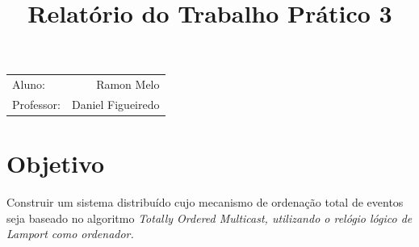 \documentclass[a4paper,12pt]{article}
\title{Relatório do Trabalho Prático 3} %
\begin{document}
        \maketitle %

        \begin{center}
            \begin{tabular}{l r}
                Aluno: & Ramon Melo \\ %
                Professor: & Daniel Figueiredo %
            \end{tabular}
        \end{center}


        
        \section{Objetivo}
        
            Construir um sistema distribuído cujo mecanismo de ordenação total de eventos seja baseado no algoritmo \em{Totally Ordered Multicast}, utilizando o relógio lógico de Lamport como ordenador.
            
            
\end{document}

